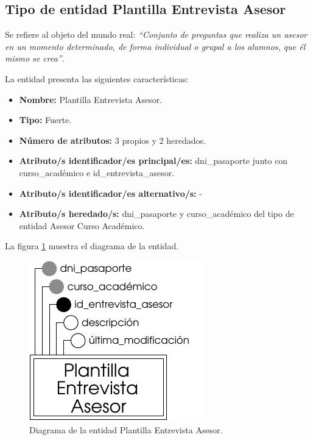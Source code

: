 \subsection{Tipo de entidad Plantilla Entrevista Asesor}

   \begin{description}

   \item[Definición] Se refiere al objeto del mundo real: \emph{``Conjunto de
   preguntas que realiza un asesor en un momento determinado, de forma
   individual o grupal a los alumnos, que él mismo se crea''}.

   \item[Características] La entidad presenta las siguientes características:
      \begin{itemize}
         \item \textbf{Nombre:} Plantilla Entrevista Asesor.
         \item \textbf{Tipo:} Fuerte.
         \item \textbf{Número de atributos:} 3 propios y 2 heredados.
         \item \textbf{Atributo/s identificador/es principal/es:} dni\_pasaporte
         junto con curso\_académico e id\_entrevista\_asesor.
         \item \textbf{Atributo/s identificador/es alternativo/s:} -
         \item \textbf{Atributo/s heredado/s:} dni\_pasaporte y curso\_académico
         del tipo de entidad Asesor Curso Académico.
      \end{itemize}

   \item[Diagrama] La figura \ref{diagramaPlantEntAse} muestra el diagrama de la entidad.
   \item \begin{figure}[!ht]
            \begin{center}
            \includegraphics[]{07.Modelo_Entidad-Interrelacion/7.2.Analisis_Entidades/diagramas/plant_ent_ase.pdf}
            \caption{Diagrama de la entidad Plantilla Entrevista Asesor.}
            \label{diagramaPlantEntAse}
            \end{center}
         \end{figure}


\end{description}
